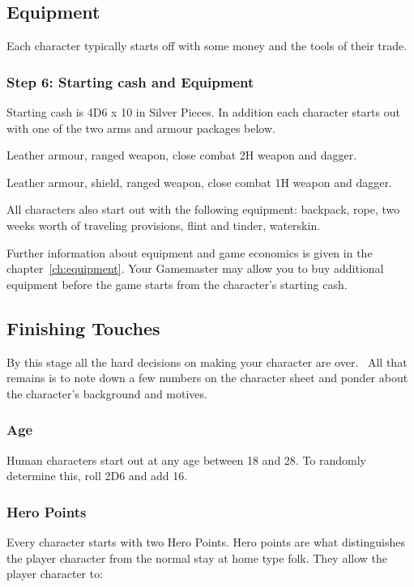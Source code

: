 \subsection{Equipment}
Each character typically starts off with some money and the tools of their trade.

\subsubsection{Step 6: Starting cash and Equipment}
Starting cash is 4D6 x 10 in Silver Pieces. In addition each character starts out with one of the two arms and armour packages below.

\begin{rpg-list}
	\item Leather armour, ranged weapon, close combat 2H weapon and dagger. 
	\item Leather armour, shield, ranged weapon, close combat 1H weapon and dagger.
\end{rpg-list}

All characters also start out with the following equipment: backpack, rope, two weeks worth of traveling provisions, flint and tinder, waterskin.

Further information about equipment and game economics is given in the chapter~\ref{ch:equipment}. Your Gamemaster may allow you to buy additional equipment before the game starts from the character’s starting cash.

\subsection{Finishing Touches}
By this stage all the hard decisions on making your character are over.  All that remains is to note down a few numbers on the character sheet and ponder about the character’s background and motives.

\subsubsection{Age}
Human characters start out at any age between 18 and 28. To randomly determine this, roll 2D6 and add 16. 

\subsubsection{Hero Points}
Every character starts with two Hero Points. Hero points are what distinguishes the player character from the normal stay at home type folk. They allow the player character to:

